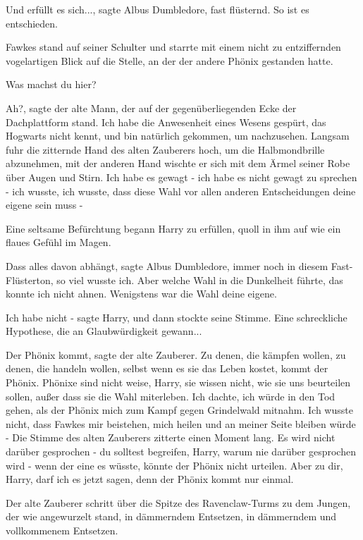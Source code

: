 \glqq{}Und erfüllt es sich...\grqq{}, sagte Albus Dumbledore, fast flüsternd.
\glqq{}So ist es entschieden.\grqq{}

Fawkes stand auf seiner Schulter und starrte mit einem nicht zu entziffernden
vogelartigen Blick auf die Stelle, an der der andere Phönix gestanden hatte.

\glqq{}Was machst du hier?\grqq{}

\glqq{}Ah?\grqq{}, sagte der alte Mann, der auf der gegenüberliegenden Ecke der
Dachplattform stand. \glqq{}Ich habe die Anwesenheit eines Wesens gespürt, das
Hogwarts nicht kennt, und bin natürlich gekommen, um nachzusehen.\grqq{} Langsam
fuhr die zitternde Hand des alten Zauberers hoch, um die Halbmondbrille
abzunehmen, mit der anderen Hand wischte er sich mit dem Ärmel seiner Robe über
Augen und Stirn. \glqq{}Ich habe es gewagt - ich habe es nicht gewagt zu sprechen
- ich wusste, ich wusste, dass diese Wahl vor allen anderen Entscheidungen deine
eigene sein muss -\grqq{}

Eine seltsame Befürchtung begann Harry zu erfüllen, quoll in ihm auf wie ein
flaues Gefühl im Magen.

\glqq{}Dass alles davon abhängt\grqq{}, sagte Albus Dumbledore, immer noch in
diesem Fast-Flüsterton, \glqq{}so viel wusste ich. Aber welche Wahl in die
Dunkelheit führte, das konnte ich nicht ahnen. Wenigstens war die Wahl deine
eigene.\grqq{}

\glqq{}Ich habe nicht -\grqq{} sagte Harry, und dann stockte seine Stimme. Eine
schreckliche Hypothese, die an Glaubwürdigkeit gewann...

\glqq{}Der Phönix kommt\grqq{}, sagte der alte Zauberer. \glqq{}Zu denen, die
kämpfen wollen, zu denen, die handeln wollen, selbst wenn es sie das Leben
kostet, kommt der Phönix. Phönixe sind nicht weise, Harry, sie wissen nicht, wie
sie uns beurteilen sollen, außer dass sie die Wahl miterleben. Ich dachte, ich
würde in den Tod gehen, als der Phönix mich zum Kampf gegen Grindelwald mitnahm.
Ich wusste nicht, dass Fawkes mir beistehen, mich heilen und an meiner Seite
bleiben würde -\grqq{} Die Stimme des alten Zauberers zitterte einen Moment
lang. \glqq{}Es wird nicht darüber gesprochen - du solltest begreifen, Harry,
warum nie darüber gesprochen wird - wenn der eine es wüsste, könnte der Phönix
nicht urteilen. Aber zu dir, Harry, darf ich es jetzt sagen, denn der Phönix
kommt nur einmal.\grqq{}

Der alte Zauberer schritt über die Spitze des Ravenclaw-Turms zu dem Jungen, der
wie angewurzelt stand, in dämmerndem Entsetzen, in dämmerndem und vollkommenem
Entsetzen.

